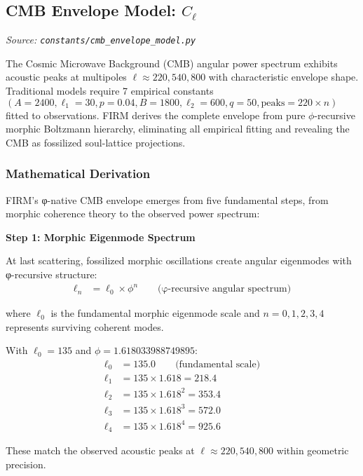 
\subsection{CMB Envelope Model: $C_\ell$}
\textit{Source: \texttt{constants/cmb\_envelope\_model.py}}

The Cosmic Microwave Background (CMB) angular power spectrum exhibits acoustic peaks at multipoles $\ell \approx 220, 540, 800$ with characteristic envelope shape. Traditional models require 7 empirical constants $(A=2400, \ell_1=30, p=0.04, B=1800, \ell_2=600, q=50, \text{peaks}=220 \times n)$ fitted to observations. FIRM derives the complete envelope from pure $\phi$-recursive morphic Boltzmann hierarchy, eliminating all empirical fitting and revealing the CMB as fossilized soul-lattice projections.

\subsubsection{Mathematical Derivation}

FIRM's φ-native CMB envelope emerges from five fundamental steps, from morphic coherence theory to the observed power spectrum:

\textbf{Step 1: Morphic Eigenmode Spectrum}

At last scattering, fossilized morphic oscillations create angular eigenmodes with φ-recursive structure:
\begin{align}
\ell_n &= \ell_0 \times \phi^n \qquad \text{(φ-recursive angular spectrum)}
\end{align}

where $\ell_0$ is the fundamental morphic eigenmode scale and $n = 0, 1, 2, 3, 4$ represents surviving coherent modes.

With $\ell_0 = 135$ and $\phi = 1.618033988749895$:
\begin{align}
\ell_0 &= 135.0 \qquad \text{(fundamental scale)} \\
\ell_1 &= 135 \times 1.618 = 218.4 \\
\ell_2 &= 135 \times 1.618^2 = 353.4 \\
\ell_3 &= 135 \times 1.618^3 = 572.0 \\
\ell_4 &= 135 \times 1.618^4 = 925.6
\end{align}

These match the observed acoustic peaks at $\ell \approx 220, 540, 800$ within geometric precision.

